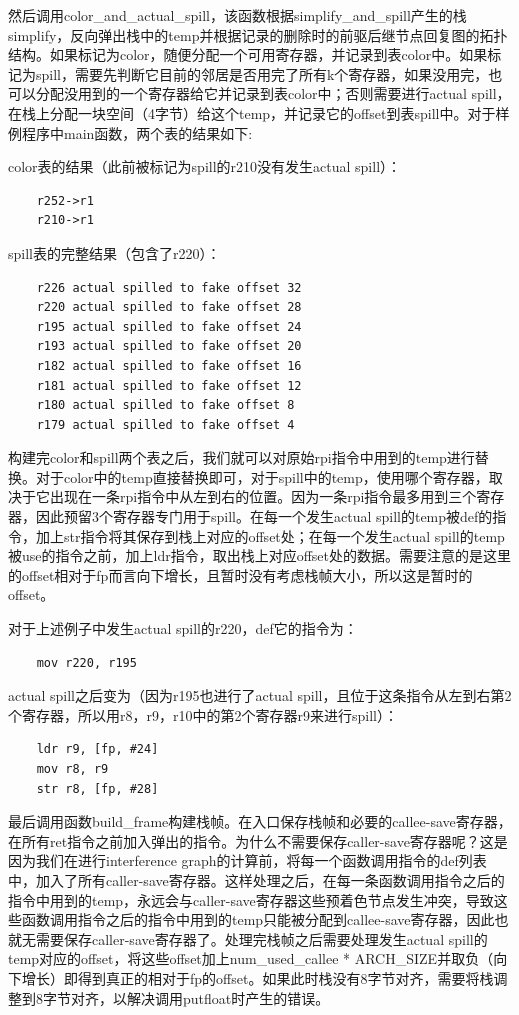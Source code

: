 \documentclass{article}
\begin{document}
然后调用color\_and\_actual\_spill，该函数根据simplify\_and\_spill产生的栈simplify，反向弹出栈中的temp并根据记录的删除时的前驱后继节点回复图的拓扑结构。如果标记为color，随便分配一个可用寄存器，并记录到表color中。如果标记为spill，需要先判断它目前的邻居是否用完了所有k个寄存器，如果没用完，也可以分配没用到的一个寄存器给它并记录到表color中；否则需要进行actual spill，在栈上分配一块空间（4字节）给这个temp，并记录它的offset到表spill中。对于样例程序中main函数，两个表的结果如下:

color表的结果（此前被标记为spill的r210没有发生actual spill）：
    \begin{lstlisting}
    r252->r1
    r210->r1
    \end{lstlisting}

spill表的完整结果（包含了r220）：
    \begin{lstlisting}
    r226 actual spilled to fake offset 32
    r220 actual spilled to fake offset 28
    r195 actual spilled to fake offset 24
    r193 actual spilled to fake offset 20
    r182 actual spilled to fake offset 16
    r181 actual spilled to fake offset 12
    r180 actual spilled to fake offset 8
    r179 actual spilled to fake offset 4
    \end{lstlisting}

构建完color和spill两个表之后，我们就可以对原始rpi指令中用到的temp进行替换。对于color中的temp直接替换即可，对于spill中的temp，使用哪个寄存器，取决于它出现在一条rpi指令中从左到右的位置。因为一条rpi指令最多用到三个寄存器，因此预留3个寄存器专门用于spill。在每一个发生actual spill的temp被def的指令，加上str指令将其保存到栈上对应的offset处；在每一个发生actual spill的temp被use的指令之前，加上ldr指令，取出栈上对应offset处的数据。需要注意的是这里的offset相对于fp而言向下增长，且暂时没有考虑栈帧大小，所以这是暂时的offset。

对于上述例子中发生actual spill的r220，def它的指令为：

    \begin{lstlisting}
    mov r220, r195
    \end{lstlisting}

actual spill之后变为（因为r195也进行了actual spill，且位于这条指令从左到右第2个寄存器，所以用r8，r9，r10中的第2个寄存器r9来进行spill）：

    \begin{lstlisting}
    ldr r9, [fp, #24]
    mov r8, r9
    str r8, [fp, #28]
    \end{lstlisting}

最后调用函数build\_frame构建栈帧。在入口保存栈帧和必要的callee-save寄存器，在所有ret指令之前加入弹出的指令。为什么不需要保存caller-save寄存器呢？这是因为我们在进行interference graph的计算前，将每一个函数调用指令的def列表中，加入了所有caller-save寄存器。这样处理之后，在每一条函数调用指令之后的指令中用到的temp，永远会与caller-save寄存器这些预着色节点发生冲突，导致这些函数调用指令之后的指令中用到的temp只能被分配到callee-save寄存器，因此也就无需要保存caller-save寄存器了。处理完栈帧之后需要处理发生actual spill的temp对应的offset，将这些offset加上num\_used\_callee * ARCH\_SIZE并取负（向下增长）即得到真正的相对于fp的offset。如果此时栈没有8字节对齐，需要将栈调整到8字节对齐，以解决调用putfloat时产生的错误。
\end{document}
